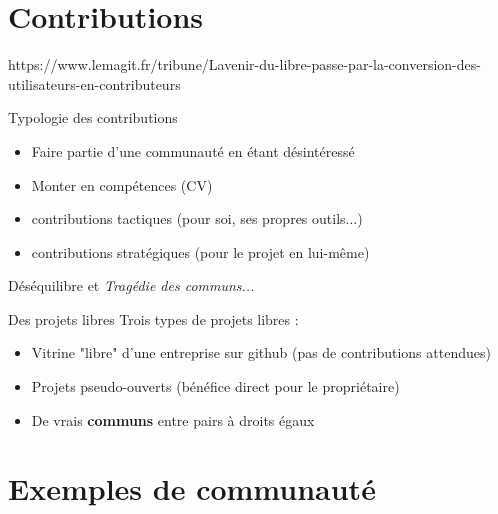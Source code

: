 \documentclass{beamer}
\begin{document}
\section{Contributions}

https://www.lemagit.fr/tribune/Lavenir-du-libre-passe-par-la-conversion-des-utilisateurs-en-contributeurs

\begin{frame}{Typologie des contributions}

  \begin{itemize}
  \item Faire partie d'une communauté en étant désintéressé
  \item Monter en compétences (CV)
  \item contributions tactiques (pour soi, ses propres outils...)
  \item contributions stratégiques (pour le projet en lui-même)
  \end{itemize}

  Déséquilibre et \textit{Tragédie des communs...}

  
\end{frame}

\begin{frame}{Des projets libres}
  Trois types de projets libres :
  \begin{itemize}
  \item Vitrine "libre" d'une entreprise sur github (pas de contributions attendues)
  \item Projets pseudo-ouverts (bénéfice direct pour le propriétaire)
  \item De vrais \textbf{communs} entre pairs à droits égaux
  \end{itemize}
\end{frame}

\section{Exemples de communauté}
\end{document}
